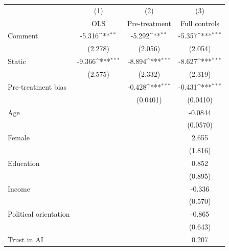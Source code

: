 {
\def\sym#1{\ifmmode^{#1}\else\(^{#1}\)\fi}
\begin{tabular}{l*{3}{c}}
\toprule
                    &\multicolumn{1}{c}{(1)}&\multicolumn{1}{c}{(2)}&\multicolumn{1}{c}{(3)}\\
                    &\multicolumn{1}{c}{OLS}&\multicolumn{1}{c}{Pre-treatment}&\multicolumn{1}{c}{Full controls}\\
\midrule
Comment             &      -5.316\sym{**} &      -5.292\sym{**} &      -5.357\sym{***}\\
                    &     (2.278)         &     (2.056)         &     (2.054)         \\
\addlinespace
Static              &      -9.366\sym{***}&      -8.894\sym{***}&      -8.627\sym{***}\\
                    &     (2.575)         &     (2.332)         &     (2.319)         \\
\addlinespace
Pre-treatment bias  &                     &      -0.428\sym{***}&      -0.431\sym{***}\\
                    &                     &    (0.0401)         &    (0.0410)         \\
\addlinespace
Age                 &                     &                     &     -0.0844         \\
                    &                     &                     &    (0.0570)         \\
\addlinespace
Female              &                     &                     &       2.655         \\
                    &                     &                     &     (1.816)         \\
\addlinespace
Education           &                     &                     &       0.852         \\
                    &                     &                     &     (0.895)         \\
\addlinespace
Income              &                     &                     &      -0.336         \\
                    &                     &                     &     (0.570)         \\
\addlinespace
Political orientation&                     &                     &      -0.865         \\
                    &                     &                     &     (0.643)         \\
\addlinespace
Trust in AI         &                     &                     &       0.207         \\

\end{tabular}}
